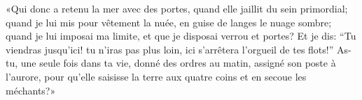 «Qui donc a retenu la mer avec des portes, quand elle jaillit du sein primordial;
	quand je lui mis pour vêtement la nuée, en guise de langes le nuage sombre;
	quand je lui imposai ma limite, et que je disposai verrou et portes?
Et je dis: “Tu viendras jusqu’ici!
	tu n’iras pas plus loin, ici s’arrêtera l’orgueil de tes flots!”
As-tu, une seule fois dans ta vie,
	donné des ordres au matin, assigné son poste à l’aurore,
	pour qu’elle saisisse la terre aux quatre coins et en secoue les méchants?»
